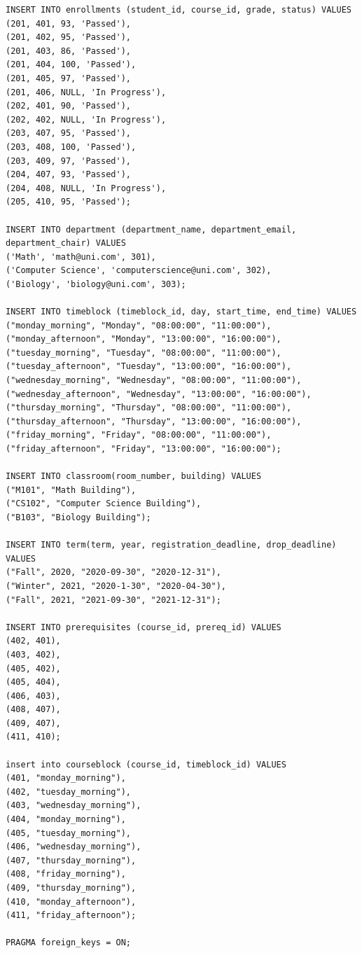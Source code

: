 \documentclass{report}
\begin{document}
\begin{lstlisting}
INSERT INTO enrollments (student_id, course_id, grade, status) VALUES
(201, 401, 93, 'Passed'),
(201, 402, 95, 'Passed'),
(201, 403, 86, 'Passed'),
(201, 404, 100, 'Passed'),
(201, 405, 97, 'Passed'),
(201, 406, NULL, 'In Progress'),
(202, 401, 90, 'Passed'),
(202, 402, NULL, 'In Progress'),
(203, 407, 95, 'Passed'),
(203, 408, 100, 'Passed'),
(203, 409, 97, 'Passed'),
(204, 407, 93, 'Passed'),
(204, 408, NULL, 'In Progress'),
(205, 410, 95, 'Passed');

INSERT INTO department (department_name, department_email, department_chair) VALUES
('Math', 'math@uni.com', 301),
('Computer Science', 'computerscience@uni.com', 302),
('Biology', 'biology@uni.com', 303);

INSERT INTO timeblock (timeblock_id, day, start_time, end_time) VALUES
("monday_morning", "Monday", "08:00:00", "11:00:00"),
("monday_afternoon", "Monday", "13:00:00", "16:00:00"),
("tuesday_morning", "Tuesday", "08:00:00", "11:00:00"),
("tuesday_afternoon", "Tuesday", "13:00:00", "16:00:00"),
("wednesday_morning", "Wednesday", "08:00:00", "11:00:00"),
("wednesday_afternoon", "Wednesday", "13:00:00", "16:00:00"),
("thursday_morning", "Thursday", "08:00:00", "11:00:00"),
("thursday_afternoon", "Thursday", "13:00:00", "16:00:00"),
("friday_morning", "Friday", "08:00:00", "11:00:00"),
("friday_afternoon", "Friday", "13:00:00", "16:00:00");

INSERT INTO classroom(room_number, building) VALUES
("M101", "Math Building"),
("CS102", "Computer Science Building"),
("B103", "Biology Building");

INSERT INTO term(term, year, registration_deadline, drop_deadline) VALUES
("Fall", 2020, "2020-09-30", "2020-12-31"),
("Winter", 2021, "2020-1-30", "2020-04-30"),
("Fall", 2021, "2021-09-30", "2021-12-31");

INSERT INTO prerequisites (course_id, prereq_id) VALUES
(402, 401),
(403, 402),
(405, 402),
(405, 404),
(406, 403),
(408, 407),
(409, 407),
(411, 410);

insert into courseblock (course_id, timeblock_id) VALUES
(401, "monday_morning"),
(402, "tuesday_morning"),
(403, "wednesday_morning"),
(404, "monday_morning"),
(405, "tuesday_morning"),
(406, "wednesday_morning"),
(407, "thursday_morning"),
(408, "friday_morning"),
(409, "thursday_morning"),
(410, "monday_afternoon"),
(411, "friday_afternoon");

PRAGMA foreign_keys = ON;
\end{lstlisting}
\end{document}

